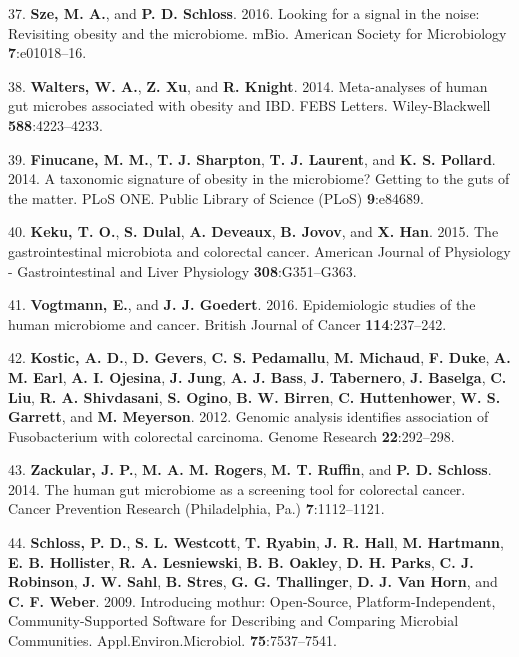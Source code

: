 \documentclass[12pt,]{article}
\begin{document}
\hypertarget{ref-Sze2016}{}
37. \textbf{Sze, M. A.}, and \textbf{P. D. Schloss}. 2016. Looking for a
signal in the noise: Revisiting obesity and the microbiome. mBio.
American Society for Microbiology \textbf{7}:e01018--16.

\hypertarget{ref-Walters2014}{}
38. \textbf{Walters, W. A.}, \textbf{Z. Xu}, and \textbf{R. Knight}.
2014. Meta-analyses of human gut microbes associated with obesity and
IBD. FEBS Letters. Wiley-Blackwell \textbf{588}:4223--4233.

\hypertarget{ref-Finucane2014}{}
39. \textbf{Finucane, M. M.}, \textbf{T. J. Sharpton}, \textbf{T. J.
Laurent}, and \textbf{K. S. Pollard}. 2014. A taxonomic signature of
obesity in the microbiome? Getting to the guts of the matter. PLoS ONE.
Public Library of Science (PLoS) \textbf{9}:e84689.

\hypertarget{ref-keku_gastrointestinal_2015}{}
40. \textbf{Keku, T. O.}, \textbf{S. Dulal}, \textbf{A. Deveaux},
\textbf{B. Jovov}, and \textbf{X. Han}. 2015. The gastrointestinal
microbiota and colorectal cancer. American Journal of Physiology -
Gastrointestinal and Liver Physiology \textbf{308}:G351--G363.

\hypertarget{ref-vogtmann_epidemiologic_2016}{}
41. \textbf{Vogtmann, E.}, and \textbf{J. J. Goedert}. 2016.
Epidemiologic studies of the human microbiome and cancer. British
Journal of Cancer \textbf{114}:237--242.

\hypertarget{ref-kostic_genomic_2012}{}
42. \textbf{Kostic, A. D.}, \textbf{D. Gevers}, \textbf{C. S.
Pedamallu}, \textbf{M. Michaud}, \textbf{F. Duke}, \textbf{A. M. Earl},
\textbf{A. I. Ojesina}, \textbf{J. Jung}, \textbf{A. J. Bass},
\textbf{J. Tabernero}, \textbf{J. Baselga}, \textbf{C. Liu}, \textbf{R.
A. Shivdasani}, \textbf{S. Ogino}, \textbf{B. W. Birren}, \textbf{C.
Huttenhower}, \textbf{W. S. Garrett}, and \textbf{M. Meyerson}. 2012.
Genomic analysis identifies association of Fusobacterium with colorectal
carcinoma. Genome Research \textbf{22}:292--298.

\hypertarget{ref-zackular_human_2014}{}
43. \textbf{Zackular, J. P.}, \textbf{M. A. M. Rogers}, \textbf{M. T.
Ruffin}, and \textbf{P. D. Schloss}. 2014. The human gut microbiome as a
screening tool for colorectal cancer. Cancer Prevention Research
(Philadelphia, Pa.) \textbf{7}:1112--1121.

\hypertarget{ref-schloss_introducing_2009}{}
44. \textbf{Schloss, P. D.}, \textbf{S. L. Westcott}, \textbf{T.
Ryabin}, \textbf{J. R. Hall}, \textbf{M. Hartmann}, \textbf{E. B.
Hollister}, \textbf{R. A. Lesniewski}, \textbf{B. B. Oakley}, \textbf{D.
H. Parks}, \textbf{C. J. Robinson}, \textbf{J. W. Sahl}, \textbf{B.
Stres}, \textbf{G. G. Thallinger}, \textbf{D. J. Van Horn}, and
\textbf{C. F. Weber}. 2009. Introducing mothur: Open-Source,
Platform-Independent, Community-Supported Software for Describing and
Comparing Microbial Communities. Appl.Environ.Microbiol.
\textbf{75}:7537--7541.
\end{document}
